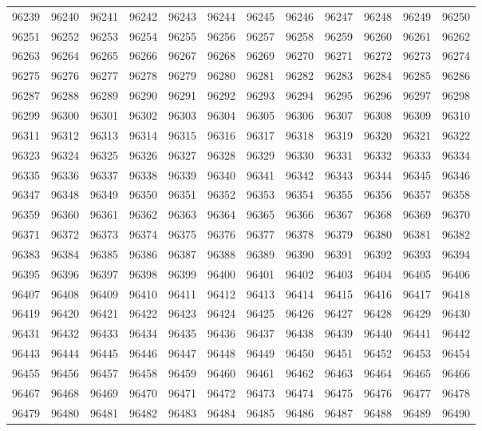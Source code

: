 \begin{center}
\begin{longtable}{llllllllllll}
96239 &96240 &96241 &96242 &96243 &96244 &96245 &96246 &96247 &96248 &96249 &96250 \\
96251 &96252 &96253 &96254 &96255 &96256 &96257 &96258 &96259 &96260 &96261 &96262 \\
96263 &96264 &96265 &96266 &96267 &96268 &96269 &96270 &96271 &96272 &96273 &96274 \\
96275 &96276 &96277 &96278 &96279 &96280 &96281 &96282 &96283 &96284 &96285 &96286 \\
96287 &96288 &96289 &96290 &96291 &96292 &96293 &96294 &96295 &96296 &96297 &96298 \\
96299 &96300 &96301 &96302 &96303 &96304 &96305 &96306 &96307 &96308 &96309 &96310 \\
96311 &96312 &96313 &96314 &96315 &96316 &96317 &96318 &96319 &96320 &96321 &96322 \\
96323 &96324 &96325 &96326 &96327 &96328 &96329 &96330 &96331 &96332 &96333 &96334 \\
96335 &96336 &96337 &96338 &96339 &96340 &96341 &96342 &96343 &96344 &96345 &96346 \\
96347 &96348 &96349 &96350 &96351 &96352 &96353 &96354 &96355 &96356 &96357 &96358 \\
96359 &96360 &96361 &96362 &96363 &96364 &96365 &96366 &96367 &96368 &96369 &96370 \\
96371 &96372 &96373 &96374 &96375 &96376 &96377 &96378 &96379 &96380 &96381 &96382 \\
96383 &96384 &96385 &96386 &96387 &96388 &96389 &96390 &96391 &96392 &96393 &96394 \\
96395 &96396 &96397 &96398 &96399 &96400 &96401 &96402 &96403 &96404 &96405 &96406 \\
96407 &96408 &96409 &96410 &96411 &96412 &96413 &96414 &96415 &96416 &96417 &96418 \\
96419 &96420 &96421 &96422 &96423 &96424 &96425 &96426 &96427 &96428 &96429 &96430 \\
96431 &96432 &96433 &96434 &96435 &96436 &96437 &96438 &96439 &96440 &96441 &96442 \\
96443 &96444 &96445 &96446 &96447 &96448 &96449 &96450 &96451 &96452 &96453 &96454 \\
96455 &96456 &96457 &96458 &96459 &96460 &96461 &96462 &96463 &96464 &96465 &96466 \\
96467 &96468 &96469 &96470 &96471 &96472 &96473 &96474 &96475 &96476 &96477 &96478 \\
96479 &96480 &96481 &96482 &96483 &96484 &96485 &96486 &96487 &96488 &96489 &96490 \\

\end{longtable}
\end{center}
